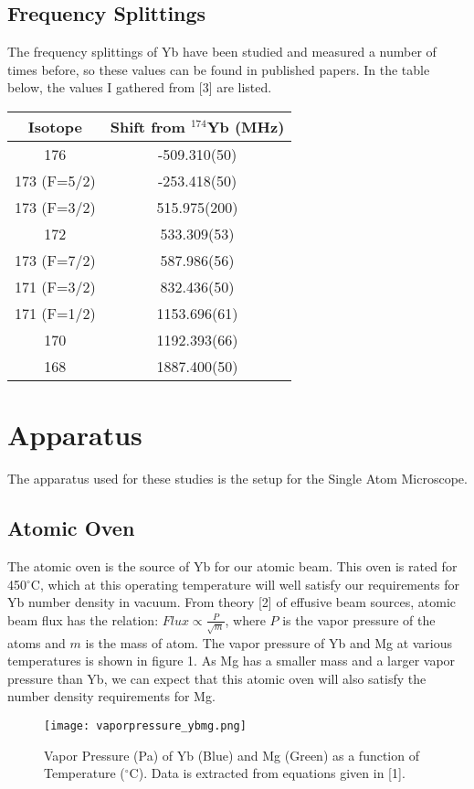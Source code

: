 \documentclass[12pt, a4paper]{article}
\begin{document}
\subsection{Frequency Splittings}
The frequency splittings of Yb have been studied and measured a number of times before, so these values can be found in published papers. In the table below, the values I gathered from [3] are listed.
\begin{center}
\begin{tabular}{||c|c||}
\hline
Isotope & Shift from $^{174}$Yb (MHz)\\
\hline\hline
176 & -509.310(50) \\
\hline
173 (F=5/2) & -253.418(50) \\
\hline
173 (F=3/2) & 515.975(200) \\
\hline
172 & 533.309(53) \\
\hline
173 (F=7/2) & 587.986(56) \\
\hline
171 (F=3/2) & 832.436(50) \\
\hline
171 (F=1/2) & 1153.696(61) \\
\hline
170 & 1192.393(66) \\
\hline
168 & 1887.400(50) \\
\hline
\end{tabular}
\end{center}

\section{Apparatus}
The apparatus used for these studies is the setup for the Single Atom Microscope. 
\subsection{Atomic Oven}
The atomic oven is the source of Yb for our atomic beam. This oven is rated for 450$^{\circ}$C, which at this operating temperature will well satisfy our requirements for Yb number density in vacuum. From theory [2] of effusive beam sources,  atomic beam flux has the relation: $Flux \propto \frac{P}{\sqrt{m}}$, where $P$ is the vapor pressure of the atoms and $m$ is the mass of atom. The vapor pressure of Yb and Mg at various temperatures is shown in figure 1. As Mg has a smaller mass and a larger vapor pressure than Yb, we can expect that this atomic oven will also satisfy the number density requirements for Mg. 


\begin{wrapfigure}{r}{0.45\textwidth}
  \texttt{[image: vaporpressure\_ybmg.png]}
  \vspace*{-3mm}
  \caption{Vapor Pressure (Pa) of Yb (Blue) and Mg (Green) as a function of Temperature ($^{\circ}$C). Data is extracted from equations given in [1].}
\end{wrapfigure}
\end{document}
